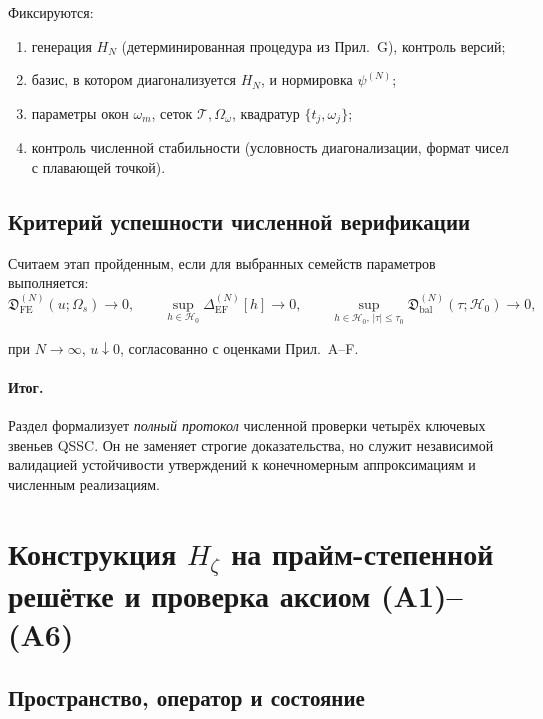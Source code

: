 \documentclass{article}
\numberwithin{equation}{section}
\theoremstyle{plain}
\theoremstyle{definition}
\theoremstyle{remark}
\def\omega{ω}\def\Omega{Ω}\def\hbar{ℏ}\def\nabla{∇}%
\def\infty{∞}\def\partial{∂}\def\sum{Σ}\def\int{∫}%
\begin{document}
Фиксируются:
\begin{enumerate}
  \item генерация \(H_N\) (детерминированная процедура из Прил.~G), контроль версий;
  \item базис, в котором диагонализуется \(H_N\), и нормировка \(\psi^{(N)}\);
  \item параметры окон \(\omega_m\), сеток \(\mathcal T,\Omega_\omega\), квадратур \(\{t_j,\omega_j\}\);
  \item контроль численной стабильности (условность диагонализации, формат чисел с плавающей точкой).
\end{enumerate}

\subsection*{Критерий успешности численной верификации}

Считаем этап пройденным, если для выбранных семейств параметров выполняется:
\begin{equation}
  \mathfrak D_{\mathrm{FE}}^{(N)}(u;\Omega_s) \to 0,\qquad
  \sup_{h\in\mathcal H_0}\Delta_{\mathrm{EF}}^{(N)}[h]\to 0,\qquad
  \sup_{h\in\mathcal H_0,\,|\tau|\le\tau_0}\mathfrak D_{\mathrm{bal}}^{(N)}(\tau;\mathcal H_0)\to 0,
\label{eq:QSSC0052}
\end{equation}

при \(N\to\infty\), \(u\downarrow 0\), согласованно с оценками Прил.~A–F.

\paragraph{Итог.}
Раздел формализует \emph{полный протокол} численной проверки четырёх ключевых звеньев QSSC. Он не заменяет строгие доказательства, но служит независимой валидацией устойчивости утверждений к конечномерным аппроксимациям и численным реализациям.


\clearpage

\section{Конструкция \texorpdfstring{$H_\zeta$}{H\_ζ} на прайм-степенной решётке и проверка аксиом (A1)–(A6)}

\subsection*{Пространство, оператор и состояние}
\end{document}
